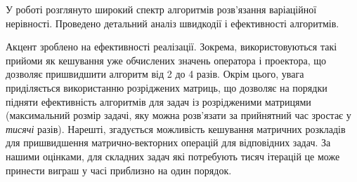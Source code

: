 У роботі розглянуто широкий спектр алгоритмів розв'язання варіаційної нерівності. Проведено детальний аналіз швидкодії і ефективності алгоритмів. \medskip

Акцент зроблено  на ефективності реалізації. Зокрема, використовуються такі прийоми як кешування уже обчислених значень оператора і проектора, що дозволяє пришвидшити алгоритм від 2 до 4 разів. Окрім цього, увага приділяється використанню розріджених матриць, що дозволяє на порядки підняти ефективність алгоритмів для задач із розрідженими матрицями (максимальний розмір задачі, яку можна розв'язати за прийнятний час зростає у \emph{тисячі} разів). Нарешті, згадується можливість кешування матричних розкладів для пришвидшення мат\-рич\-но-век\-тор\-них операцій для відповідних задач. За нашими оцінками, для складних задач які потребують тисяч ітерацій це може принести виграш у часі приблизно на один порядок.
